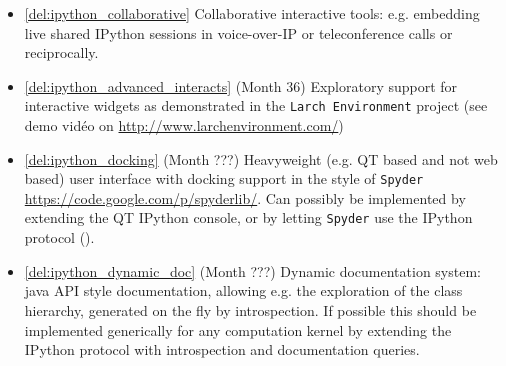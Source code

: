 \begin{Workpackage}{\thewpno}
\begin{WPDeliverables}
\begin{itemize}
  \item \ref{del:ipython_collaborative} Collaborative interactive
    tools: e.g. embedding live shared IPython sessions in
    voice-over-IP or teleconference calls or reciprocally.

  \item \ref{del:ipython_advanced_interacts} (Month 36) Exploratory
    support for interactive widgets as demonstrated in the \texttt{Larch
      Environment} project (see demo vidéo on
    \url{http://www.larchenvironment.com/})
  \item \ref{del:ipython_docking} (Month ???) Heavyweight (e.g. QT
    based and not web based) user interface with docking support in
    the style of \texttt{Spyder}
    \url{https://code.google.com/p/spyderlib/}. Can possibly be
    implemented by extending the QT IPython console, or by letting
    \texttt{Spyder} use the IPython protocol ().

  \item \ref{del:ipython_dynamic_doc} (Month ???) Dynamic
    documentation system: java API style documentation, allowing
    e.g. the exploration of the class hierarchy, generated on the fly
    by introspection.  If possible this should be implemented
    generically for any computation kernel by extending the IPython
    protocol with introspection and documentation queries.


\end{itemize}
\end{WPDeliverables}
\end{Workpackage}
